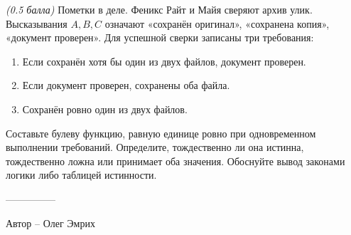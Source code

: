 \question
\textit{(0.5 балла)} Пометки в деле. Феникс Райт и Майя сверяют архив улик. Высказывания $A,B,C$ означают «сохранён оригинал», «сохранена копия», «документ проверен». Для успешной сверки записаны три требования:
\begin{enumerate}
\item Если сохранён хотя бы один из двух файлов, документ проверен.
\item Если документ проверен, сохранены оба файла.
\item Сохранён ровно один из двух файлов.
\end{enumerate}
Составьте булеву функцию, равную единице ровно при одновременном выполнении требований. Определите, тождественно ли она истинна, тождественно ложна или принимает оба значения. Обоснуйте вывод законами логики либо таблицей истинности.

---------------

Автор -- Олег Эмрих
